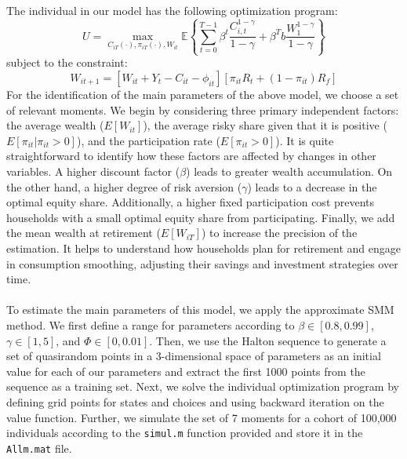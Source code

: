 \documentclass[13pt]{article}
\begin{document}
The individual in our model has the following optimization program:
\begin{equation*}
U = \max_{C_{iT}(\cdot), \pi_{iT}(\cdot), W_{it}} \mathbb{E} \left\{
\sum_{t=0}^{T-1} \beta^t \frac{C_{i, t}^{1-\gamma}}{1-\gamma} + \beta^T b \frac{W_{1}^{1-\gamma}}{1-\gamma}\right\}
\end{equation*}
subject to the constraint:
\begin{equation*}
W_{it+1} = \left[ W_{it} + Y_t - C_{it} - \phi_{it} \right] \left[ \pi_{it} R_t + (1 - \pi_{it}) R_f \right]
\end{equation*}
For the identification of the main parameters of the above model, we choose a set of relevant moments. We begin by considering three primary independent factors: the average wealth (\(E[W_{it}]\)), the average risky share given that it is positive (\(E[\pi_{it}|\pi_{it} > 0]\)), and the participation rate (\(E[\pi_{it} > 0]\)). It is quite straightforward to identify how these factors are affected by changes in other variables. A higher discount factor (\(\beta\)) leads to greater wealth accumulation. On the other hand, a higher degree of risk aversion (\(\gamma\)) leads to a decrease in the optimal equity share. Additionally, a higher fixed participation cost prevents households with a small optimal equity share from participating. Finally, we add the mean wealth at retirement (\(E[W_{iT}]\)) to increase the precision of the estimation. It helps to understand how households plan for retirement and engage in consumption smoothing, adjusting their savings and investment strategies over time.
\\\\
To estimate the main parameters of this model, we apply the approximate SMM method. We first define a range for parameters according to \(\beta \in [0.8, 0.99]\), \(\gamma \in [1, 5]\), and \(\Phi \in [0, 0.01]\). Then, we use the Halton sequence to generate a set of quasirandom points in a 3-dimensional space of parameters as an initial value for each of our parameters and extract the first 1000 points from the sequence as a training set. Next, we solve the individual optimization program by defining grid points for states and choices and using backward iteration on the value function. Further, we simulate the set of 7 moments for a cohort of 100,000 individuals according to the \texttt{simul.m} function provided and store it in the \texttt{Allm.mat} file.
\\\\
\end{document}
